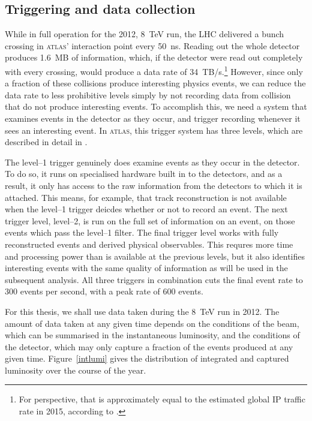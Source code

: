 \subsection{Triggering and data collection}
While in full operation for the 2012, 8~TeV run, the LHC delivered a bunch crossing in \textsc{atlas}' interaction point every 50~ns. Reading out the whole detector produces 1.6~MB of information, which, if the detector were read out completely with every crossing, would produce a data rate of 34~TB/s.\footnote{For perspective, that is approximately equal to the estimated global IP traffic rate in 2015, according to \cite{wolframip}.} However, since only a fraction of these collisions produce interesting physics events, we can reduce the data rate to less prohibitive levels simply by not recording data from collision that do not produce interesting events. To accomplish this, we need a system that examines events in the detector as they occur, and trigger recording whenever it sees an interesting event. In \textsc{atlas}, this trigger system has three levels, which are described in detail in \cite{detectorpaper}. 

The level--1 trigger genuinely does examine events as they occur in the detector. To do so, it runs on specialised hardware built in to the detectors, and as a result, it only has access to the raw information from the detectors to which it is attached. This means, for example, that track reconstruction is not available when the level--1 trigger deicdes whether or not to record an event. The next trigger level, level--2, is run on the full set of information on an event, on those events which pass the level--1 filter. The final trigger level works with fully reconstructed events and derived physical observables. This requres more time and processing power than is available at the previous levels, but it also identifies interesting events with the same quality of information as will be used in the subsequent analysis. All three triggers in combination cuts the final event rate to 300 events per second, with a peak rate of 600 events.

For this thesis, we shall use data taken during the 8~TeV run in 2012. The amount of data taken at any given time depends on the conditions of the beam, which can be summarised in the instantaneous luminosity, and the conditions of the detector, which may only capture a fraction of the events produced at any given time. Figure~\ref{intlumi} gives the distribution of integrated and captured luminosity over the course of the year.

